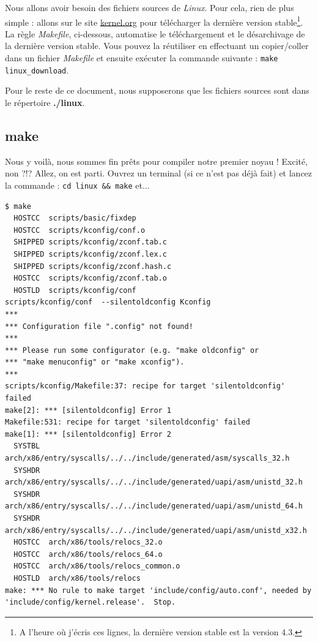 \documentclass[a4paper]{article}
\begin{document}
Nous allons avoir besoin des fichiers sources de \textit{Linux}. Pour cela, rien de plus simple : allons sur le site \href{http://www.kernel.org}{kernel.org} pour télécharger la dernière version stable\footnote{A l'heure où j'écris ces lignes, la dernière version stable est la version 4.3.}.\\

La règle \textit{Makefile}, ci-dessous, automatise le téléchargement et le désarchivage de la dernière version stable. Vous pouvez la réutiliser en effectuant un copier/coller dans un fichier \textit{Makefile} et ensuite exécuter la commande suivante : \lstset{language=sh}\lstinline{make linux_download}.\\

\lstset{language=make}


Pour le reste de ce document, nous supposerons que les fichiers sources sont dans le répertoire \textbf{./linux}.\\

\subsection{make}

Nous y voilà, nous sommes fin prêts pour compiler notre premier noyau ! Excité, non ?!? Allez, on est parti. Ouvrez un terminal (si ce n'est pas déjà fait) et lancez la commande : \lstset{language=sh}\lstinline{cd linux && make} et...

\begin{verbatim}
$ make
  HOSTCC  scripts/basic/fixdep
  HOSTCC  scripts/kconfig/conf.o
  SHIPPED scripts/kconfig/zconf.tab.c
  SHIPPED scripts/kconfig/zconf.lex.c
  SHIPPED scripts/kconfig/zconf.hash.c
  HOSTCC  scripts/kconfig/zconf.tab.o
  HOSTLD  scripts/kconfig/conf
scripts/kconfig/conf  --silentoldconfig Kconfig
***
*** Configuration file ".config" not found!
***
*** Please run some configurator (e.g. "make oldconfig" or
*** "make menuconfig" or "make xconfig").
***
scripts/kconfig/Makefile:37: recipe for target 'silentoldconfig' failed
make[2]: *** [silentoldconfig] Error 1
Makefile:531: recipe for target 'silentoldconfig' failed
make[1]: *** [silentoldconfig] Error 2
  SYSTBL  arch/x86/entry/syscalls/../../include/generated/asm/syscalls_32.h
  SYSHDR  arch/x86/entry/syscalls/../../include/generated/uapi/asm/unistd_32.h
  SYSHDR  arch/x86/entry/syscalls/../../include/generated/uapi/asm/unistd_64.h
  SYSHDR  arch/x86/entry/syscalls/../../include/generated/uapi/asm/unistd_x32.h
  HOSTCC  arch/x86/tools/relocs_32.o
  HOSTCC  arch/x86/tools/relocs_64.o
  HOSTCC  arch/x86/tools/relocs_common.o
  HOSTLD  arch/x86/tools/relocs
make: *** No rule to make target 'include/config/auto.conf', needed by 'include/config/kernel.release'.  Stop.
\end{verbatim}
\end{document}
